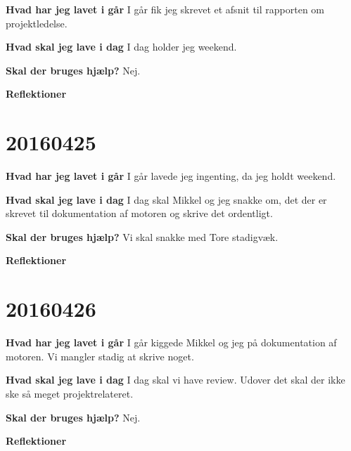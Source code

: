 \documentclass{article}
\begin{document}
	\textbf{Hvad har jeg lavet i går}
	I går fik jeg skrevet et afsnit til rapporten om projektledelse. 
	
	\textbf{Hvad skal jeg lave i dag}
	I dag holder jeg weekend. 
	
	\textbf{Skal der bruges hjælp?}
	Nej.  
	
	\textbf{Reflektioner}
	
	\section{20160425}
	
	\textbf{Hvad har jeg lavet i går}
	I går lavede jeg ingenting, da jeg holdt weekend. 
	
	\textbf{Hvad skal jeg lave i dag}
	I dag skal Mikkel og jeg snakke om, det der er skrevet til dokumentation af motoren og skrive det ordentligt. 
	
	\textbf{Skal der bruges hjælp?}
	Vi skal snakke med Tore stadigvæk. 
	
	\textbf{Reflektioner}
	
	\section{20160426}
	
	\textbf{Hvad har jeg lavet i går}
	I går kiggede Mikkel og jeg på dokumentation af motoren. Vi mangler stadig at skrive noget. 
	
	\textbf{Hvad skal jeg lave i dag}
	I dag skal vi have review. Udover det skal der ikke ske så meget projektrelateret. 
	
	\textbf{Skal der bruges hjælp?}
	Nej.  
	
	\textbf{Reflektioner}
	
\end{document}
